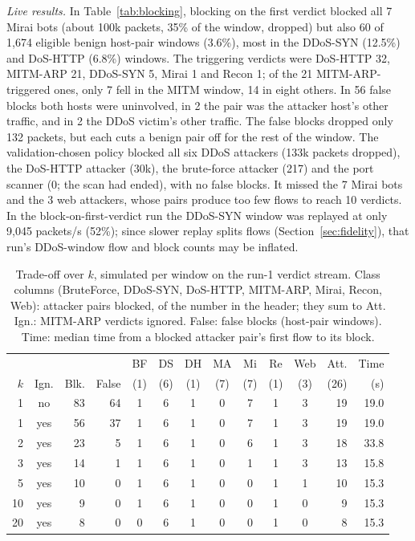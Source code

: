 \emph{Live results.} In Table~\ref{tab:blocking}, blocking on the first verdict blocked all 7 Mirai bots (about 100k packets, 35\% of the window, dropped) but also 60 of 1,674 eligible benign host-pair windows (3.6\%), most in the DDoS-SYN (12.5\%) and DoS-HTTP (6.8\%) windows. The triggering verdicts were DoS-HTTP 32, MITM-ARP 21, DDoS-SYN 5, Mirai 1 and Recon 1; of the 21 MITM-ARP-triggered ones, only 7 fell in the MITM window, 14 in eight others. In 56 false blocks both hosts were uninvolved, in 2 the pair was the attacker host's other traffic, and in 2 the DDoS victim's other traffic. The false blocks dropped only 132 packets, but each cuts a benign pair off for the rest of the window. The validation-chosen policy blocked all six DDoS attackers (133k packets dropped), the DoS-HTTP attacker (30k), the brute-force attacker (217) and the port scanner (0; the scan had ended), with no false blocks. It missed the 7 Mirai bots and the 3 web attackers, whose pairs produce too few flows to reach 10 verdicts. In the block-on-first-verdict run the DDoS-SYN window was replayed at only 9,045 packets/s (52\%); since slower replay splits flows (Section~\ref{sec:fidelity}), that run's DDoS-window flow and block counts may be inflated.

\begin{table}[t]
\centering
\caption{Trade-off over $k$, simulated per window on the run-1 verdict stream. Class columns (BruteForce, DDoS-SYN, DoS-HTTP, MITM-ARP, Mirai, Recon, Web): attacker pairs blocked, of the number in the header; they sum to Att. Ign.: MITM-ARP verdicts ignored. False: false blocks (host-pair windows). Time: median time from a blocked attacker pair's first flow to its block.}
\label{tab:kcurve}
\footnotesize
\setlength{\tabcolsep}{2.4pt}
\begin{tabular}{rcrrcccccccrr}
\hline
 & & & & BF & DS & DH & MA & Mi & Re & Web & Att. & Time \\
$k$ & Ign. & Blk. & False & (1) & (6) & (1) & (7) & (7) & (1) & (3) & (26) & (s) \\
\hline
1  & no  & 83 & 64 & 1 & 6 & 1 & 0 & 7 & 1 & 3 & 19 & 19.0 \\
1  & yes & 56 & 37 & 1 & 6 & 1 & 0 & 7 & 1 & 3 & 19 & 19.0 \\
2  & yes & 23 &  5 & 1 & 6 & 1 & 0 & 6 & 1 & 3 & 18 & 33.8 \\
3  & yes & 14 &  1 & 1 & 6 & 1 & 0 & 1 & 1 & 3 & 13 & 15.8 \\
5  & yes & 10 &  0 & 1 & 6 & 1 & 0 & 0 & 1 & 1 & 10 & 15.3 \\
10 & yes &  9 &  0 & 1 & 6 & 1 & 0 & 0 & 1 & 0 &  9 & 15.3 \\
20 & yes &  8 &  0 & 0 & 6 & 1 & 0 & 0 & 1 & 0 &  8 & 15.3 \\
\hline
\end{tabular}
\end{table}

